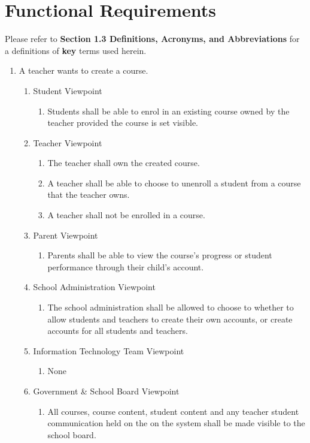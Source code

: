 \documentclass[]{article}
\begin{document}

\section{Functional Requirements}
\label{sec:functional_requirements}

Please refer to \textbf{Section 1.3 Definitions, Acronyms, and Abbreviations}
for a definitions of \textbf{key} terms used herein.


\begin{enumerate}[{BE}1.]
	\item A teacher wants to create a course.
	\begin{enumerate}[{VP1}.1]
		\item Student Viewpoint
			\begin{enumerate}
				\item Students shall be able to enrol in an existing course owned by the
teacher provided the course is set visible.
			\end{enumerate}
		\item Teacher Viewpoint
			\begin{enumerate}
			    \item The teacher shall own the created course.
				\item A teacher shall be able to choose to unenroll a student from a course
that the teacher owns.
				\item A teacher shall not be enrolled in a course.
			\end{enumerate}
		\item Parent Viewpoint
			\begin{enumerate}
				\item Parents shall be able to view the course's progress or student 
performance through their child's account.
			\end{enumerate}
		\item School Administration Viewpoint
			\begin{enumerate}
				\item The school administration shall be allowed to choose to whether to 
allow students and teachers
to create their own accounts, or create accounts for all students and teachers.
			\end{enumerate}
		\item Information Technology Team Viewpoint
			\begin{enumerate}
				\item None
			\end{enumerate}
		\item Government \& School Board Viewpoint
			\begin{enumerate}
				\item All courses, course content, student content and any teacher student
communication held on the on the system shall be made visible to the school
board.
			\end{enumerate}
	\end{enumerate}


\end{enumerate}
\end{document}
